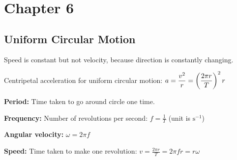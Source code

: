\section{Chapter 6}

\subsection{Uniform Circular Motion}

Speed is constant but not velocity, because direction is constantly changing.

Centripetal acceleration for uniform circular motion:
$\displaystyle a = \frac{v^2}{r} = \left(\frac{2\pi r}{T}\right)^2 r$

\textbf{Period:} Time taken to go around circle one time.

\textbf{Frequency:} Number of revolutions per second: $\displaystyle f = \frac{1}{T}$ (unit is $\mathrm{s}^{-1}$)

\textbf{Angular velocity:} $\omega = 2\pi f$

\textbf{Speed:} Time taken to make one revolution: $\displaystyle v = \frac{2\pi r}{T} = 2\pi fr = r\omega$
